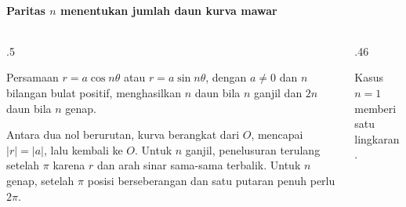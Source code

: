 \documentclass{../../kalkulus-ppt}
\newcommand{\sumbubidang}[4]{%
    \draw[sumbu] (#1,0) -- (#2,0) node[right,font=\scriptsize] {$x$};
    \draw[sumbu] (0,#3) -- (0,#4) node[above,font=\scriptsize] {$y$};
}
\begin{document}
\begin{frame}{\insertsection}
    \framesubtitle{Paritas $n$ menentukan jumlah daun kurva mawar}
    \begin{columns}[c,onlytextwidth]
        \begin{column}{.5\textwidth}
            \begin{definisi}
                Persamaan $r=a\cos n\theta$ atau $r=a\sin n\theta$,
                dengan $a\ne0$ dan $n$ bilangan bulat positif,
                menghasilkan $n$ daun bila $n$ ganjil dan
                $2n$ daun bila $n$ genap.
            \end{definisi}
            Antara dua nol berurutan, kurva berangkat
            dari $O$, mencapai $|r|=|a|$, lalu kembali ke $O$.
            Untuk $n$ ganjil, penelusuran terulang setelah
            $\pi$ karena $r$ dan arah sinar sama-sama
            terbalik. Untuk $n$ genap, setelah $\pi$ posisi
            berseberangan dan satu putaran penuh perlu $2\pi$.
        \end{column}
        \begin{column}{.46\textwidth}
            \centering
            \par
            \small Kasus $n=1$ memberi satu lingkaran.
        \end{column}
    \end{columns}
\end{frame}
\end{document}
